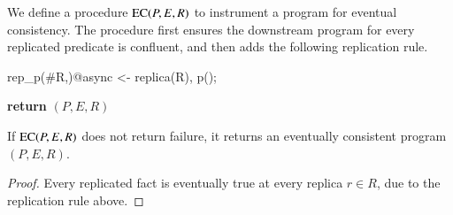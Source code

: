 

We define a procedure $\textsc{EC}(P, E, R)$ to instrument a program for eventual consistency.  The procedure first ensures the downstream program for every replicated predicate is confluent, and then adds the following replication rule.

\begin{Dedalus}
rep_p(#R,)@async <- replica(R), p();
\end{Dedalus}

\begin{algorithmic}[1]
  \EndFor
  \EndIf
  \EndIf
  \EndFor
  \State \textbf{return} $(P, E, R)$
  \EndProcedure
\end{algorithmic}

\begin{theorem}
If $\textsc{EC}(P, E, R)$ does not return failure, it returns an eventually consistent program $(P, E, R)$.
\end{theorem}
\begin{proof}
Every replicated fact is eventually true at every replica $r \in R$, due to the replication rule above.
\end{proof}

